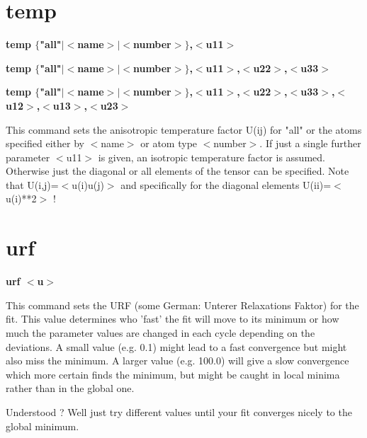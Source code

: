 \section{temp}
{\bf temp $ \{$"all"$| $$ <$name$> $$| $$ <$number$> $$\} $,$ <$u11$> $ \par }
{\bf temp $ \{$"all"$| $$ <$name$> $$| $$ <$number$> $$\} $,$ <$u11$> $,$ <$u22$> $,$ <$u33$> $ \par }
{\bf temp $ \{$"all"$| $$ <$name$> $$| $$ <$number$> $$\} $,$ <$u11$> $,$ <$u22$> $,$ <$u33$> $,$ <$u12$> $,$ <$u13$> $,$ <$u23$> $ \par }
\par
\vspace{3pt}
This command sets the anisotropic temperature factor U(ij) for 
"all" or the atoms specified either by $ <$name$> $ or atom type 
$ <$number$> $. If just a single further parameter $ <$u11$> $ is given, 
an isotropic temperature factor is assumed. Otherwise just 
the diagonal or all elements of the tensor can be specified. 
Note that U(i,j)=$ <$u(i)u(j)$> $ and specifically for the diagonal 
elements U(ii)=$ <$u(i)**2$> $ ! 
\section{urf}
{\bf urf $ <$u$> $ \par }
\par
\vspace{3pt}
This command sets the URF (some German: Unterer Relaxations Faktor) 
for the fit. This value determines who 'fast' the fit will move to 
its minimum or how much the parameter values are changed in each 
cycle depending on the deviations. A small value (e.g. 0.1) might 
lead to a fast convergence but might also miss the minimum. A larger 
value (e.g. 100.0) will give a slow convergence which more certain 
finds the minimum, but might be caught in local minima rather than in 
the global one. 
\par
Understood ? Well just try different values until your fit converges 
nicely to the global minimum. 
